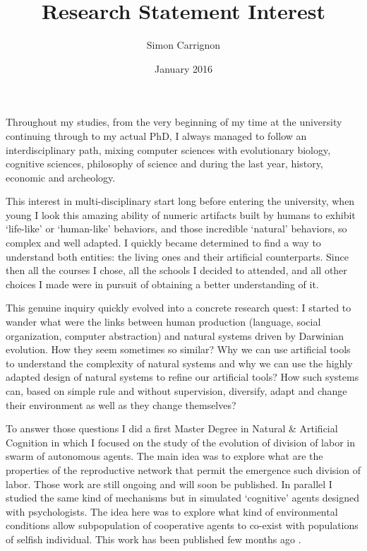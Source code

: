 \documentclass[10pt]{article}
\author{Simon Carrignon}
\title{Research Statement Interest}
\date{January 2016}
\begin{document}
\maketitle


Throughout my studies, from the very beginning of my time at the university continuing through to my actual PhD, I always managed to follow an interdisciplinary path, mixing computer sciences with evolutionary biology, cognitive sciences, philosophy of science and during the last year, history, economic and archeology.

This interest in multi-disciplinary start long before entering the university, when young I look this amazing ability of numeric artifacts built by humans to exhibit ‘life-like’ or ‘human-like’ behaviors, and those incredible ‘natural' behaviors, so complex and well adapted. I quickly became determined to find a way to understand both entities: the living ones and their artificial counterparts. Since then all the courses I chose, all the schools I decided to attended, and all other choices I made were in pursuit of obtaining a better understanding of it.

This genuine inquiry quickly evolved into a concrete research quest: I started to wander what were the links between human production (language, social organization, computer abstraction) and natural systems driven by Darwinian evolution. How they seem sometimes so similar? Why we can use artificial tools to understand the complexity of natural systems and why we can use the highly adapted design of natural systems to refine our artificial tools? How such systems can, based on simple rule and without supervision, diversify, adapt and change their environment as well as they change themselves? 

To answer those questions I did a first Master Degree in Natural \& Artificial Cognition in which I focused on the study of the evolution of division of labor in swarm of autonomous agents. The main idea was to explore what are the properties of the reproductive network that permit the emergence such division of labor. Those work are still ongoing and will soon be published. In parallel I studied the same kind of mechanisms but in simulated ‘cognitive’ agents designed with psychologists. The idea here was to explore  what kind of environmental conditions allow subpopulation of cooperative agents to co-exist with populations of selfish individual. This work has been published few months ago \cite{zibetti2015acaciaesanagentbasedmodelingandsimulationtoolforinvestigatingsocialbehaviorsinresourcelimitedtwodimensionalenvironments}.
\end{document}
